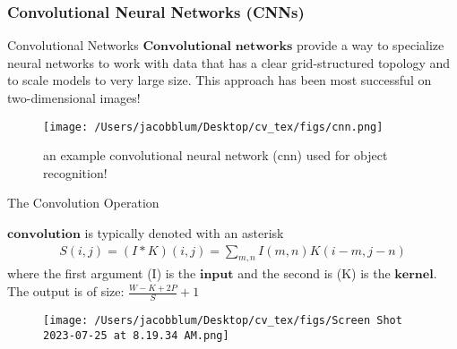 \documentclass{beamer}
\begin{document}
\subsubsection{Convolutional Neural Networks (CNNs)}
\begin{frame}[plain]{Convolutional Networks}
    $\textbf{Convolutional networks}$ provide a way to specialize neural networks to work with data that has a clear grid-structured topology and to scale models to very large size. This 
    approach has been most successful on two-dimensional images! 
    
    \begin{figure}
        \centering
        \texttt{[image: /Users/jacobblum/Desktop/cv\_tex/figs/cnn.png]}
        \caption{an example convolutional neural network (cnn) used for object recognition!}
    \end{figure}
\end{frame}

\begin{frame}[plain]{The Convolution Operation}
\begin{definition}
    $\textbf{convolution}$ is typically denoted with an asterisk
    \begin{align*}
        S(i, j) = (I * K)(i,j) = \sum_{m,n} I(m,n)K(i-m, j-n)
    \end{align*} 
    where the first argument (I) is the $\textbf{input}$ and the second is (K) is the $\textbf{kernel}$. The output is of size: $\frac{W-K+2P}{S} + 1$
\end{definition}
    \begin{figure}
        \centering
        \texttt{[image: /Users/jacobblum/Desktop/cv\_tex/figs/Screen Shot 2023-07-25 at 8.19.34 AM.png]}
    \end{figure}
\end{frame}
\end{document}
